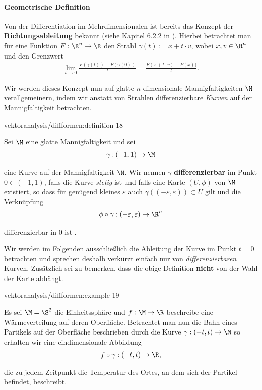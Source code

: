\documentclass[letterpaper,10pt,english]{jupyterBook}
\begin{document}
\paragraph{Geometrische Definition}
\label{\detokenize{vektoranalysis/diffformen:geometrische-definition}}
\par
Von der Differentiation im Mehrdimensionalen ist bereits das Konzept der \textbf{Richtungsableitung} bekannt (siehe Kapitel 6.2.2 in \cite{Ten21}).
Hierbei betrachtet man für eine Funktion \(F:\R^n\to\R\) den Strahl \(\gamma(t):= x + t\cdot v\), wobei \(x,v\in\R^n\) und den Grenzwert
\begin{align*}
\lim_{t\to 0} \frac{F(\gamma(t)) - F(\gamma(0))}{t} = \frac{F(x + t\cdot v) - F(x))}{t}.
\end{align*}
\par
Wir werden dieses Konzept nun auf glatte \(n\) dimensionale Mannigfaltigkeiten \(\M\) verallgemeinern, indem wir anstatt von Strahlen differenzierbare \emph{Kurven} auf der Mannigfaltigkeit betrachten.
\begin{definition}{}{vektoranalysis/diffformen:definition-18}



\par
Sei \(\M\) eine glatte Mannigfaltigkeit und sei
\begin{align*}
\gamma \colon (-1,1) \rightarrow \M
\end{align*}
\par
eine Kurve auf der Mannigfaltigkeit \(\M\).
Wir nennen \(\gamma\) \textbf{differenzierbar} im Punkt \(0\in(-1,1)\), falls die Kurve \emph{stetig} ist und falls eine Karte \((U,\phi)\) von \(\M\) existiert, so dass für genügend kleines \(\varepsilon\) auch \(\gamma((-\varepsilon,\varepsilon))\subset U\) gilt und die Verknüpfung
\begin{align*}
\phi \circ \gamma:(-\varepsilon,\varepsilon)\to\R^n
\end{align*}
\par
differenzierbar in \(0\) ist .
\end{definition}

\par
Wir werden im Folgenden ausschließlich die Ableitung der Kurve im Punkt \(t=0\) betrachten und sprechen deshalb verkürzt einfach nur von \emph{differenzierbaren} Kurven.
Zusätzlich sei zu bemerken, dass die obige Definition \textbf{nicht} von der Wahl der Karte abhängt.
\begin{example}{}{vektoranalysis/diffformen:example-19}



\par
Es sei \(\M=\S^2\) die Einheitssphäre und \(f:\M\to\R\) beschreibe eine Wärmeverteilung auf deren Oberfläche.
Betrachtet man nun die Bahn eines Partikels auf der Oberfläche beschrieben durch die Kurve \(\gamma:(-t, t)\to \M\) so erhalten wir eine eindimensionale Abbildung
\begin{align*}
f\circ\gamma:(-t,t)\to \R,
\end{align*}
\par
die zu jedem Zeitpunkt die Temperatur des Ortes, an dem sich der Partikel befindet, beschreibt.
\end{example}
\end{document}
